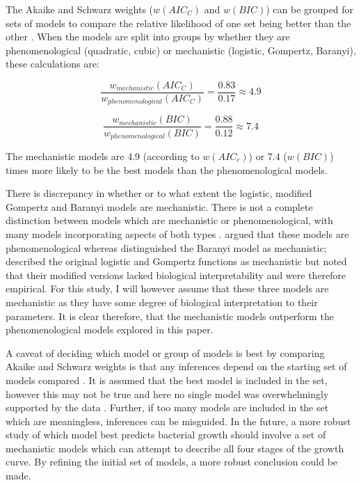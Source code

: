 \documentclass[11pt]{article}
\begin{document}
\begin{linenumbers}
        The Akaike and Schwarz weights ($w(AIC_C)$ and $w(BIC)$) can be grouped for sets of models to compare the relative likelihood of one set being better than the other \citep{wagenmakers_aic_2004}. When the models are split into groups by whether they are phenomenological (quadratic, cubic) or mechanistic (logistic, Gompertz, Baranyi), these calculations are:
        
        \begin{equation}
            \frac{w_{mechanistic}(AIC_C)}{w_{phenomenological}(AIC_C)} = \frac{0.83}{0.17} \approx 4.9 
        \end{equation}
        
        \begin{equation}
            \frac{w_{mechanistic}(BIC)}{w_{phenomenological}(BIC)} = \frac{0.88}{0.12} \approx 7.4
        \end{equation}
        
        The mechanistic models are 4.9 (according to $w(AIC_c)$) or 7.4 ($w(BIC)$) times more likely to be the best models than the phenomenological models. 
        
        There is discrepancy in whether or to what extent the logistic, modified Gompertz and Baranyi models are mechanistic. There is not a complete distinction between models which are mechanistic or phenomenological, with many models incorporating aspects of both types \citep{ferrer_mathematical_2009}. \cite{peleg_modeling_1997} argued that these models are phenomenological whereas \cite{ferrer_mathematical_2009} distinguished the Baranyi model as mechanistic; \cite{mckellar_primary_2003} described the original logistic and Gompertz functions as mechanistic but noted that their modified versions lacked biological interpretability and were therefore empirical. For this study, I will however assume that these three models are mechanistic as they have some degree of biological interpretation to their parameters. It is clear therefore, that the mechanistic models outperform the phenomenological models explored in this paper. 
        
        A caveat of deciding which model or group of models is best by comparing Akaike and Schwarz weights is that any inferences depend on the starting set of models compared \citep{johnson_model_2004}. It is assumed that the best model is included in the set, however this may not be true and here no single model was overwhelmingly supported by the data \citep{buchanan_when_1997}. Further, if too many models are included in the set which are meaningless, inferences can be misguided. In the future, a more robust study of which model best predicts bacterial growth should involve a set of mechanistic models which can attempt to describe all four stages of the growth curve. By refining the initial set of models, a more robust conclusion could be made.
        

\end{linenumbers}
\end{document}

